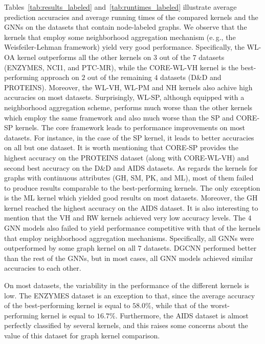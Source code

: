 \documentclass[twoside,11pt]{article}
\newcommand{\eg}{e.\,g., }
\begin{document}
Tables~\ref{tab:results_labeled} and~\ref{tab:runtimes_labeled} illustrate average prediction accuracies and average running times of the compared kernels and the GNNs on the datasets that contain node-labeled graphs.
We observe that the kernels that employ some neighborhood aggregation mechanism (\eg the Weisfeiler-Lehman framework) yield very good performance.
Specifically, the WL-OA kernel outperforms all the other kernels on $3$ out of the $7$ datasets (ENZYMES, NCI1, and PTC-MR), while the CORE-WL-VH kernel is the best-performing approach on $2$ out of the remaining $4$ datasets (D\&D and PROTEINS).
Moreover, the WL-VH, WL-PM and NH kernels also achive high accuracies on most datasets.
Surprisingly, WL-SP, although equipped with a neighborhood aggregation scheme, performs much worse than the other kernels which employ the same framework and also much worse than the SP and CORE-SP kernels.
The core framework leads to performance improvements on most datasets.
For instance, in the case of the SP kernel, it leads to better accuracies on all but one dataset.
It is worth mentioning that CORE-SP provides the highest accuracy on the PROTEINS dataset (along with CORE-WL-VH) and second best accuracy on the D\&D and AIDS datasets.
As regards the kernels for graphs with continuous attributes (GH, SM, PK, and ML), most of them failed to produce results comparable to the best-performing kernels.
The only exception is the ML kernel which yielded good results on most datasets.
Moreover, the GH kernel reached the highest accuracy on the AIDS dataset.
It is also interesting to mention that the VH and RW kernels achieved very low accuracy levels.
The $4$ GNN models also failed to yield performance competitive with that of the kernels that employ neighborhood aggregation mechanisms.
Specifically, all GNNs were outperformed by some graph kernel on all $7$ datasets.
DGCNN performed better than the rest of the GNNs, but in most cases, all GNN models achieved similar accuracies to each other.

On most datasets, the variability in the performance of the different kernels is low.
The ENZYMES dataset is an exception to that, since the average accuracy of the best-performing kernel is equal to $58.0\%$, while that of the worst-performing kernel is equal to $16.7\%$.
Furthermore, the AIDS dataset is almost perfectly classified by several kernels, and this raises some concerns about the value of this dataset for graph kernel comparison.
\end{document}
